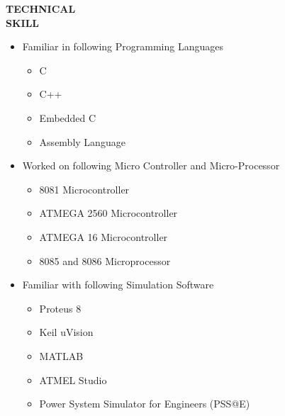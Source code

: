 \documentclass{article}
\begin{document}
 
 \begin{flushleft}
 	\vspace{0.4in}
 	\textbf{TECHNICAL  \\ SKILL}
 	\begin{itemize}
 		\vspace{-0.45in}
 		\addtolength{\itemindent}{1.359in}
 		\item  Familiar in following Programming Languages
 		{\begin{itemize}
 				\addtolength{\itemindent}{1.359in}
 				\item C
 				\item C++
 				\item Embedded C
 				\item Assembly Language
 				
 			\end{itemize}
 		}  
 		\item Worked on following  Micro Controller and Micro-Processor
 		{\begin{itemize}
 				\addtolength{\itemindent}{1.359in}
 				\item 8081 Microcontroller
 				\item ATMEGA 2560 Microcontroller
 				\item ATMEGA 16 Microcontroller
 				\item 8085 and 8086 Microprocessor
 				
 			\end{itemize}
 		} 
 		\item  Familiar with following Simulation Software
 		{\begin{itemize}
 				\addtolength{\itemindent}{1.359in}
 				\item Proteus 8
 				\item Keil uVision
 				\item MATLAB  	
 				\item ATMEL Studio
 				\item Power System Simulator for Engineers (PSS@E)		
 			\end{itemize}
 		} 
 		
 	\end{itemize}
 \end{flushleft}
 
\end{document}
